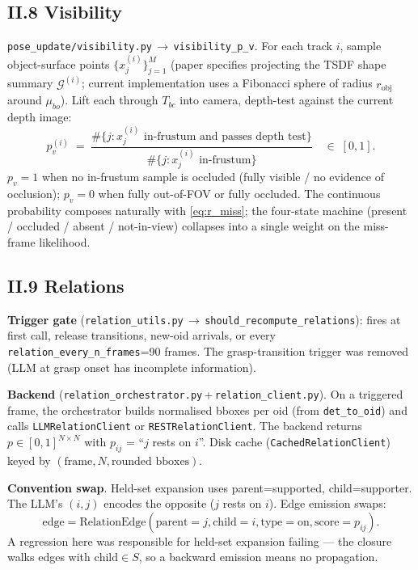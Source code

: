\documentclass[11pt]{article}
\newcommand{\file}[1]{\texttt{#1}}
\begin{document}
\subsection*{II.8 Visibility}\label{sec:vis}

\file{pose\_update/visibility.py}\,$\to$\,\texttt{visibility\_p\_v}.
For each track $i$, sample object-surface points
$\{x_j^{(i)}\}_{j=1}^M$ (paper specifies projecting the TSDF shape
summary $\mathcal{G}^{(i)}$; current implementation uses a Fibonacci
sphere of radius $r_{\text{obj}}$ around $\mu_{bo}$). Lift each through
$T_{bc}$ into camera, depth-test against the current depth image:
\begin{equation}\label{eq:pv}
p_v^{(i)} \;=\;
\frac{\#\bigl\{j : x_j^{(i)} \text{ in-frustum and passes depth test}\bigr\}}
     {\#\bigl\{j : x_j^{(i)} \text{ in-frustum}\bigr\}}
\quad\in\;[0,1].
\end{equation}
$p_v=1$ when no in-frustum sample is occluded (fully visible / no
evidence of occlusion); $p_v=0$ when fully out-of-FOV or fully occluded.
The continuous probability composes naturally with \eqref{eq:r_miss};
the four-state machine (present / occluded / absent / not-in-view)
collapses into a single weight on the miss-frame likelihood.

\subsection*{II.9 Relations}

\textbf{Trigger gate}
(\file{relation\_utils.py}\,$\to$\,\texttt{should\_recompute\_relations}):
fires at first call, release transitions, new-oid arrivals, or every
\texttt{relation\_every\_n\_frames}=90 frames. The grasp-transition
trigger was removed (LLM at grasp onset has incomplete information).

\textbf{Backend} (\file{relation\_orchestrator.py}\,+\,\file{relation\_client.py}).
On a triggered frame, the orchestrator builds normalised bboxes per
oid (from \texttt{det\_to\_oid}) and calls
\texttt{LLMRelationClient} or \texttt{RESTRelationClient}. The
backend returns $p\in[0,1]^{N\times N}$ with $p_{ij}$ = ``$j$ rests
on $i$''. Disk cache (\texttt{CachedRelationClient}) keyed by
$(\text{frame},N,\text{rounded bboxes})$.

\textbf{Convention swap}. Held-set expansion uses
parent=supported, child=supporter. The LLM's $(i,j)$ encodes the
opposite ($j$ rests on $i$). Edge emission swaps:
$$\mathrm{edge} = \mathrm{RelationEdge}(\text{parent}=j,\text{child}=i,\text{type}=\text{on},\text{score}=p_{ij}).$$
A regression here was responsible for held-set expansion failing —
the closure walks edges with $\text{child}\in S$, so a backward
emission means no propagation.
\end{document}
